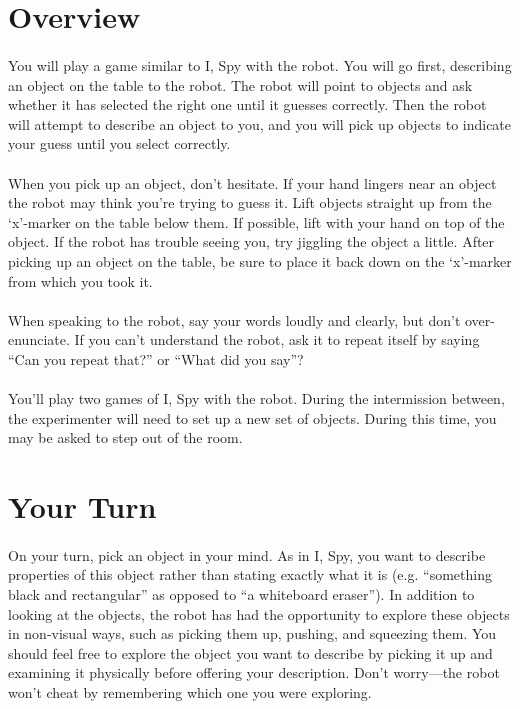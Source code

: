 \documentclass{article}
\begin{document}
\section{Overview}

\paragraph{} You will play a game similar to I, Spy with the robot. You will go first, describing an object on the table to the robot. The robot will point to objects and ask whether it has selected the right one until it guesses correctly. Then the robot will attempt to describe an object to you, and you will pick up objects to indicate your guess until you select correctly.

\paragraph{} When you pick up an object, don't hesitate. If your hand lingers near an object the robot may think you're trying to guess it. Lift objects straight up from the `x'-marker on the table below them. If possible, lift with your hand on top of the object. If the robot has trouble seeing you, try jiggling the object a little. After picking up an object on the table, be sure to place it back down on the `x'-marker from which you took it.

\paragraph{} When speaking to the robot, say your words loudly and clearly, but don't over-enunciate. If you can't understand the robot, ask it to repeat itself by saying ``Can you repeat that?'' or ``What did you say''?

\paragraph{} You'll play two games of I, Spy with the robot. During the intermission between, the experimenter will need to set up a new set of objects. During this time, you may be asked to step out of the room.

\section{Your Turn}

\paragraph{} On your turn, pick an object in your mind. As in I, Spy, you want to describe properties of this object rather than stating exactly what it is (e.g. ``something black and rectangular'' as opposed to ``a whiteboard eraser''). In addition to looking at the objects, the robot has had the opportunity to explore these objects in non-visual ways, such as picking them up, pushing, and squeezing them. You should feel free to explore the object you want to describe by picking it up and examining it physically before offering your description. Don't worry---the robot won't cheat by remembering which one you were exploring.
\end{document}
